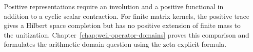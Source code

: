 Positive representations require an involution and a positive functional
in addition to a cyclic scalar contraction.
For finite matrix kernels, the positive trace gives a Hilbert space
completion but has no positive extension of finite mass to the unitization.
Chapter~\ref{chap:weil-operator-domains} proves this comparison and
formulates the arithmetic domain question using the zeta explicit formula.
